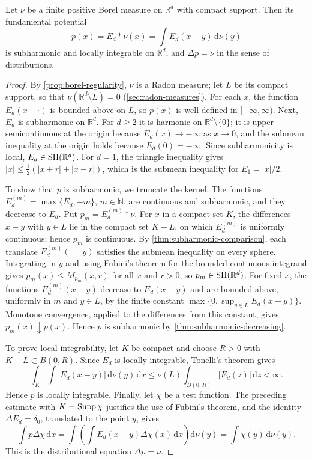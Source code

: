 \begin{proposition}\label{prop:fundamental-potential}
Let $\nu$ be a finite positive Borel measure on $\mathbb R^d$ with compact support. Then its fundamental potential
\[
 p(x)=E_d*\nu(x)=\int E_d(x-y)\,\mathrm d\nu(y)
\]
is subharmonic and locally integrable on $\mathbb R^d$, and $\Delta p=\nu$ in the sense of distributions.
\end{proposition}
\begin{proof}
By \cref{prop:borel-regularity}, $\nu$ is a Radon measure; let $L$ be its compact support, so that $\nu(\mathbb R^d\setminus L)=0$ (\cref{sec:radon-measures}). For each $x$, the function $E_d(x-\cdot)$ is bounded above on $L$, so $p(x)$ is well defined in $[-\infty,\infty)$. Next, $E_d$ is subharmonic on $\mathbb R^d$. For $d\geq2$ it is harmonic on $\mathbb R^d\setminus\{0\}$; it is upper semicontinuous at the origin because $E_d(x)\to-\infty$ as $x\to0$, and the submean inequality at the origin holds because $E_d(0)=-\infty$. Since subharmonicity is local, $E_d\in\mathrm{SH}(\mathbb R^d)$. For $d=1$, the triangle inequality gives $|x|\leq\frac12(|x+r|+|x-r|)$, which is the submean inequality for $E_1=|x|/2$.

To show that $p$ is subharmonic, we truncate the kernel. The functions $E_d^{(m)}=\max\{E_d,-m\}$, $m\in\mathbb N$, are continuous and subharmonic, and they decrease to $E_d$. Put $p_m=E_d^{(m)}*\nu$. For $x$ in a compact set $K$, the differences $x-y$ with $y\in L$ lie in the compact set $K-L$, on which $E_d^{(m)}$ is uniformly continuous; hence $p_m$ is continuous. By \cref{thm:subharmonic-comparison}, each translate $E_d^{(m)}(\cdot-y)$ satisfies the submean inequality on every sphere. Integrating in $y$ and using Fubini's theorem for the bounded continuous integrand gives $p_m(x)\leq M_{p_m}(x,r)$ for all $x$ and $r>0$, so $p_m\in\mathrm{SH}(\mathbb R^d)$. For fixed $x$, the functions $E_d^{(m)}(x-y)$ decrease to $E_d(x-y)$ and are bounded above, uniformly in $m$ and $y\in L$, by the finite constant $\max\{0,\sup_{y\in L}E_d(x-y)\}$. Monotone convergence, applied to the differences from this constant, gives $p_m(x)\downarrow p(x)$. Hence $p$ is subharmonic by \cref{thm:subharmonic-decreasing}.

To prove local integrability, let $K$ be compact and choose $R>0$ with $K-L\subset B(0,R)$. Since $E_d$ is locally integrable, Tonelli's theorem gives
\[
 \int_K\int|E_d(x-y)|\,\mathrm d\nu(y)\,\mathrm d x
 \leq\nu(L)\int_{B(0,R)}|E_d(z)|\,\mathrm d z<\infty.
\]
Hence $p$ is locally integrable. Finally, let $\chi$ be a test function. The preceding estimate with $K=\operatorname{Supp}\chi$ justifies the use of Fubini's theorem, and the identity $\Delta E_d=\delta_0$, translated to the point $y$, gives
\[
 \int p\Delta\chi\,\mathrm d x
 =\int\left(\int E_d(x-y)\Delta\chi(x)\,\mathrm d x\right)\mathrm d\nu(y)
 =\int\chi(y)\,\mathrm d\nu(y).
\]
This is the distributional equation $\Delta p=\nu$.
\end{proof}

